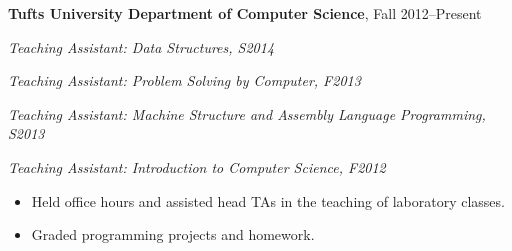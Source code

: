 \documentclass[10pt, letter]{article}
\newenvironment{list1}{
  \begin{list}{\ding{113}}{%
      \setlength{\itemsep}{0in}
      \setlength{\parsep}{0in} \setlength{\parskip}{0in}
      \setlength{\topsep}{0in} \setlength{\partopsep}{0in} 
      \setlength{\leftmargin}{0.17in}}}{\end{list}}
\begin{document}
\vspace{6pt}
{\bf Tufts University Department of Computer Science}, Fall 2012--Present\\
\vspace*{-.15in}
\begin{list1}
\item [] {\em Teaching Assistant: Data Structures, S2014}
\item [] {\em Teaching Assistant: Problem Solving by Computer, F2013}
\item [] {\em Teaching Assistant: Machine Structure and Assembly Language Programming, S2013}
\item [] {\em Teaching Assistant: Introduction to Computer Science, F2012}
\item [] {\begin{itemize}[topsep=0pt,itemsep=-1pt]
    \item Held office hours and assisted head TAs in the teaching of laboratory classes.
    \item Graded programming projects and homework.
\end{itemize}}
\vspace{6pt}

\end{list1}
\end{document}
